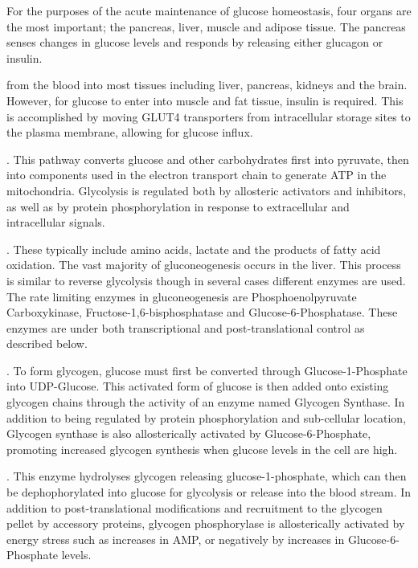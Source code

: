 \documentclass{tufte-handout}
\begin{document}
For the purposes of the acute maintenance of glucose homeostasis, four organs are the most important; the pancreas, liver, muscle and adipose tissue.  The pancreas senses changes in glucose levels and responds by releasing either glucagon or insulin. 

 from the blood into most tissues including liver, pancreas, kidneys and the brain.  However, for glucose to enter into muscle and fat tissue, insulin is required.  This is accomplished by moving GLUT4 transporters from intracellular storage sites to the plasma membrane, allowing for glucose influx.  

.  This pathway converts glucose and other carbohydrates first into pyruvate, then into components used in the electron transport chain to generate ATP in the mitochondria.  Glycolysis is regulated both by allosteric activators and inhibitors, as well as by protein phosphorylation in response to extracellular and intracellular signals.

.  These typically include amino acids, lactate and the products of fatty acid oxidation.  The vast majority of gluconeogenesis occurs in the liver.  This process is similar to reverse glycolysis though in several cases different enzymes are used.  The rate limiting enzymes in gluconeogenesis are Phosphoenolpyruvate Carboxykinase, Fructose-1,6-bisphosphatase and Glucose-6-Phosphatase.  These enzymes are under both transcriptional and post-translational control as described below.

.  To form glycogen, glucose must first be converted through Glucose-1-Phosphate into UDP-Glucose.  This activated form of glucose is then added onto existing glycogen chains through the activity of an enzyme named Glycogen Synthase.  In addition to being regulated by protein phosphorylation and sub-cellular location, Glycogen synthase is also allosterically activated by Glucose-6-Phosphate, promoting increased glycogen synthesis when glucose levels in the cell are high.

.  This enzyme hydrolyses glycogen releasing glucose-1-phosphate, which can then be dephophorylated into glucose for glycolysis or release into the blood stream.  In addition to post-translational modifications and recruitment to the glycogen pellet by accessory proteins, glycogen phosphorylase is allosterically activated by energy stress such as increases in AMP, or negatively by increases in Glucose-6-Phosphate levels.
\end{document}

